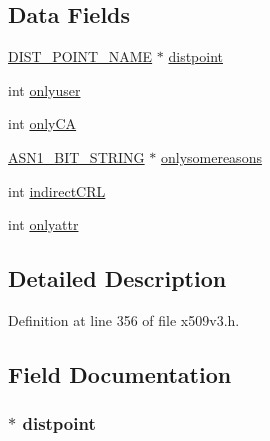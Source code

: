 \subsection*{Data Fields}
\begin{DoxyCompactItemize}
\item 
\hyperlink{crypto_2x509v3_2x509v3_8h_a1e98b413217a18a88255e02b31263c93}{D\+I\+S\+T\+\_\+\+P\+O\+I\+N\+T\+\_\+\+N\+A\+ME} $\ast$ \hyperlink{struct_i_s_s_u_i_n_g___d_i_s_t___p_o_i_n_t__st_a68c5a256dcc49ce4f3b635f9d06ae331}{distpoint}
\item 
int \hyperlink{struct_i_s_s_u_i_n_g___d_i_s_t___p_o_i_n_t__st_a3214c6458d718cdb12d907f57ae190bf}{onlyuser}
\item 
int \hyperlink{struct_i_s_s_u_i_n_g___d_i_s_t___p_o_i_n_t__st_aa13e18185959b0df44e77412babb3d21}{only\+CA}
\item 
\hyperlink{crypto_2ossl__typ_8h_af837aaa00e151b1e8773aea5a8fe1cc4}{A\+S\+N1\+\_\+\+B\+I\+T\+\_\+\+S\+T\+R\+I\+NG} $\ast$ \hyperlink{struct_i_s_s_u_i_n_g___d_i_s_t___p_o_i_n_t__st_a613bf8bcc4df62ec4e728d913dc5e44f}{onlysomereasons}
\item 
int \hyperlink{struct_i_s_s_u_i_n_g___d_i_s_t___p_o_i_n_t__st_ad049e6c55812192d9b4c8953caa1b6a5}{indirect\+C\+RL}
\item 
int \hyperlink{struct_i_s_s_u_i_n_g___d_i_s_t___p_o_i_n_t__st_a98c3887903444657c22398e68f8f3bff}{onlyattr}
\end{DoxyCompactItemize}


\subsection{Detailed Description}


Definition at line 356 of file x509v3.\+h.



\subsection{Field Documentation}
\subsubsection[{\texorpdfstring{distpoint}{distpoint}}]{ $\ast$ distpoint}\hypertarget{struct_i_s_s_u_i_n_g___d_i_s_t___p_o_i_n_t__st_a68c5a256dcc49ce4f3b635f9d06ae331}{}\label{struct_i_s_s_u_i_n_g___d_i_s_t___p_o_i_n_t__st_a68c5a256dcc49ce4f3b635f9d06ae331}


